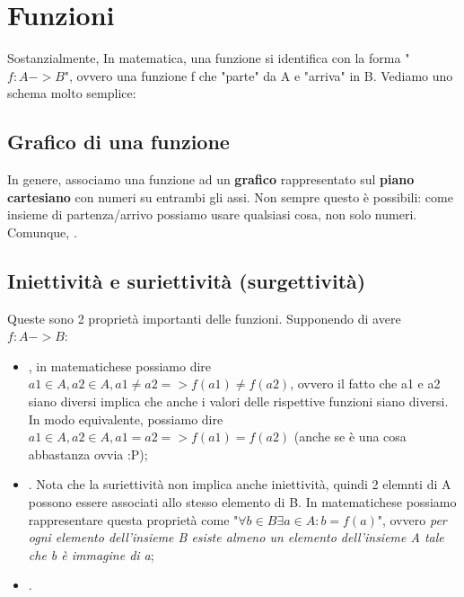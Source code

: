 \newpage
\section{Funzioni}
	Sostanzialmente, 
	In matematica, una funzione si identifica con la forma "$f: A -> B$", ovvero una funzione f che "parte" da A e "arriva" in B. Vediamo uno schema molto semplice:
	
	\subsection{Grafico di una funzione}
		In genere, associamo una funzione ad un \textbf{grafico} rappresentato sul \textbf{piano cartesiano} con numeri su entrambi gli assi. Non sempre questo è possibili: come insieme di partenza/arrivo possiamo usare qualsiasi cosa, non solo numeri. Comunque, .
		
	\subsection{Iniettività e suriettività (surgettività)}
		Queste sono 2 proprietà importanti delle funzioni. Supponendo di avere $f:A->B$:
		\begin{itemize}
			\item {}, in matematichese possiamo dire $a1\in A, a2\in A, a1\neq a2=>f(a1)\neq f(a2)$, ovvero il fatto che a1 e a2 siano diversi implica che anche i valori delle rispettive funzioni siano diversi. In modo equivalente, possiamo dire $a1\in A, a2\in A, a1=a2=>f(a1)=f(a2)$ (anche se è una cosa abbastanza ovvia :P);
			\item {}. Nota che la suriettività non implica anche iniettività, quindi 2 elemnti di A possono essere associati allo stesso elemento di B. In matematichese possiamo rappresentare questa proprietà come "$\forall b\in B \exists a\in A : b=f(a)$", ovvero \textit{per ogni elemento dell'insieme B esiste almeno un elemento dell'insieme A tale che b è immagine di a};
			\item {}.
		\end{itemize}
	
